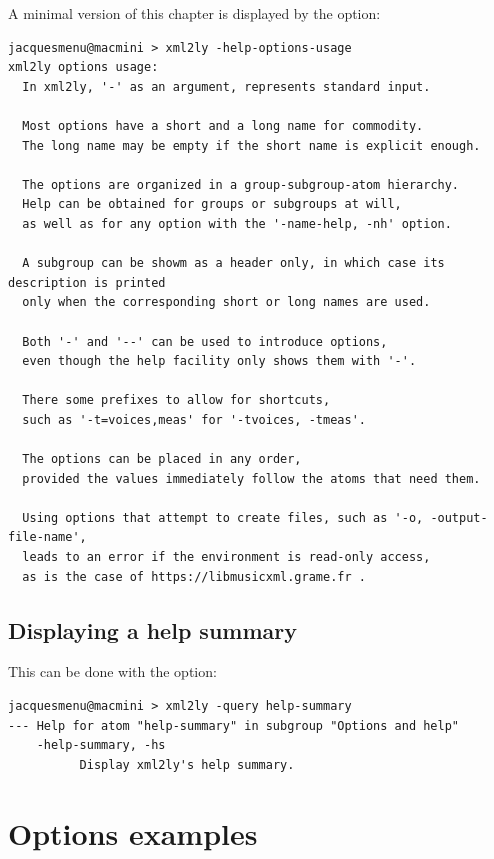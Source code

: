 A minimal version of this chapter is displayed by the  option:
\begin{lstlisting}[language=Terminal]
jacquesmenu@macmini > xml2ly -help-options-usage
xml2ly options usage:
  In xml2ly, '-' as an argument, represents standard input.

  Most options have a short and a long name for commodity.
  The long name may be empty if the short name is explicit enough.

  The options are organized in a group-subgroup-atom hierarchy.
  Help can be obtained for groups or subgroups at will,
  as well as for any option with the '-name-help, -nh' option.

  A subgroup can be showm as a header only, in which case its description is printed
  only when the corresponding short or long names are used.

  Both '-' and '--' can be used to introduce options,
  even though the help facility only shows them with '-'.

  There some prefixes to allow for shortcuts,
  such as '-t=voices,meas' for '-tvoices, -tmeas'.

  The options can be placed in any order,
  provided the values immediately follow the atoms that need them.

  Using options that attempt to create files, such as '-o, -output-file-name',
  leads to an error if the environment is read-only access,
  as is the case of https://libmusicxml.grame.fr .
\end{lstlisting}


\section{Displaying a help summary}

This can be done with the  option:
\begin{lstlisting}[language=Terminal]
jacquesmenu@macmini > xml2ly -query help-summary
--- Help for atom "help-summary" in subgroup "Options and help"
    -help-summary, -hs
          Display xml2ly's help summary.
\end{lstlisting}


\chapter{Options examples}\label{Options examples}

